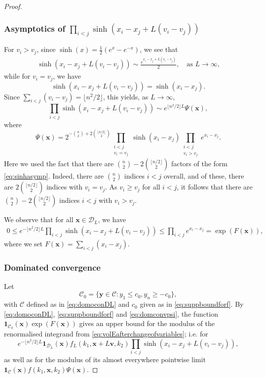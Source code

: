 \documentclass[10pt,a4paper]{amsart}
\newcommand{\x}{\mathbf{x}}
\newcommand{\y}{\mathbf{y}}
\begin{document}
\begin{proof}
\subsubsection*{Asymptotics of $\prod_{i<j} \sinh(x_i-x_j + L(v_i-v_j))$} 
For $v_i > v_j $, since $\sinh(x) = \frac{1}{2}(e^x - e^{-x})$, we see that 
      \begin{align}\label{eq:sinhasymp}
          \sinh(x_i - x_j + L(v_i-v_j)) 
       \sim \frac{e^{x_i - x_j + L(v_i-v_j)}}{2}, \quad \text{as $L \to \infty$,}
      \end{align}
            while for $v_i = v_j$, we have
      \[
      \sinh(x_i - x_j + L(v_i-v_j)) = \sinh(x_i-x_j).
      \]
      Since $\sum_{i<j}(v_i-v_j) = \lfloor n^2/2 \rfloor$, this yields, as $L \to \infty$,   
      \[
      \prod_{i<j} \sinh(x_i - x_j + L(v_i-v_j)) \sim 
      e^{\lfloor n^2/2 \rfloor L} \Psi(\mathbf{x})
      ,
      \]
      where 
      \[
      \Psi(\mathbf{x}) = 2^{-\binom{n}{2}+2\binom{\lfloor n/2 \rfloor}{2}} \prod_{\substack{i < j \\ v_i = v_j}}
      \sinh(x_i-x_j)
      \prod_{\substack{i < j \\ v_i > v_j}} e^{x_i - x_j}.
      \]
    Here we used the fact that there are $\binom{n}{2}-2\binom{\lfloor n/2 \rfloor}{2}$
    factors of the form \eqref{eq:sinhasymp}. Indeed, there
    are $\binom{n}{2}$ indices $i<j$ overall, and of these, there are $2\binom{\lfloor n/2 \rfloor}{2}$ indices  with $v_i = v_j$. As $v_i \ge v_j$ for all $i<j$, it follows that there are $\binom{n}{2}-2\binom{\lfloor n/2 \rfloor}{2}$ indices $i<j$ with $v_i>v_j$.

      
      We observe that for all $\x \in \mathcal{D}_L$, we have
      \begin{align}\label{eq:domconvpsi}
      0 \le
          e^{-\lfloor n^2/2 \rfloor L}\prod_{i<j} \sinh(x_i - x_j + L(v_i-v_j)) \le \prod_{i<j} e^{x_i-x_j} =\exp(F(\x)),
      \end{align}
      where we set $F(\x)=\sum_{i<j}(x_i-x_j)$.

\subsubsection*{Dominated convergence} 
      Let 
      \[
      \mathcal{C}_0 = 
      \{ 
      \y \in \mathcal{C}:  y_1 \le c_0 , y_n  \ge -c_0
      \},
      \]
      with $\mathcal{C}$ defined as in \eqref{eq:domoconDL} and $c_0$ given as in \eqref{eq:suppboundforf}. By \eqref{eq:domoconDL},
      \eqref{eq:suppboundforf} and 
      \eqref{eq:domconvpsi},  the function 
      $\mathbf{1}_{\mathcal{C}_0} (\mathbf{x}) \exp(F(\x))$ gives an upper bound for the modulus of the renormalised integrand from  \eqref{eq:volEafterchangeofvariables}; i.e. for
      \[
       e^{-\lfloor n^2/2\rfloor L}
       \mathbf{1}_{\mathcal{D}_L}(\mathbf{x})
     f_L(k_1,\mathbf{x}+L\mathbf{v},k_2) 
      \prod_{i<j} \sinh(x_i - x_j + L(v_i-v_j)),
      \]
      as well as for the modulus of its almost everywhere pointwise limit 
      $
      \mathbf{1}_{\mathcal{C}}(\x)
     f(k_1,\mathbf{x},k_2)
      \Psi(\x)$.
      

\end{proof}
\end{document}
